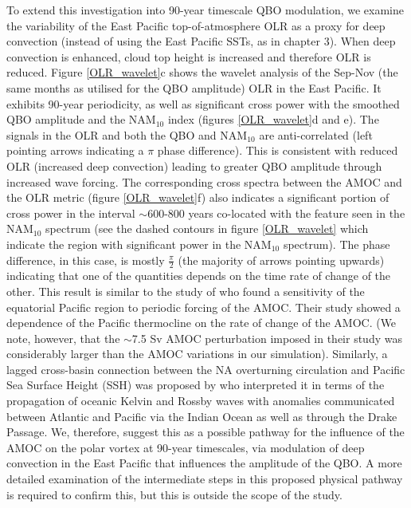 To extend this investigation into 90-year timescale QBO modulation, we examine the variability of the East Pacific top-of-atmosphere OLR as a proxy for deep convection (instead of using the East Pacific SSTs, as in chapter 3). When deep convection is enhanced, cloud top height is increased and therefore OLR is reduced. Figure \ref{OLR_wavelet}c shows the wavelet analysis of the Sep-Nov (the same months as utilised for the QBO amplitude) OLR in the East Pacific. It exhibits 90-year periodicity, as well as significant cross power with the smoothed QBO amplitude and the NAM$_{10}$ index (figures \ref{OLR_wavelet}d and e). The signals in the OLR and both the QBO and NAM$_{10}$ are anti-correlated (left pointing arrows indicating a $\pi$ phase difference). This is consistent with reduced OLR (increased deep convection) leading to greater QBO amplitude through increased wave forcing.  The corresponding cross spectra between the AMOC and the OLR metric (figure \ref{OLR_wavelet}f) also indicates a significant portion of cross power in the interval $\sim$600-800 years co-located with the feature seen in the NAM$_{10}$ spectrum (see the dashed contours in figure \ref{OLR_wavelet} which indicate the region with  significant power in the NAM$_{10}$ spectrum). The phase difference, in this case, is mostly $\frac{\pi}{2}$ (the majority of arrows pointing upwards) indicating that one of the quantities depends on the time rate of change of the other. This result is similar to the study of \cite{timmermannENSO2005d} who found a sensitivity of the equatorial Pacific region to periodic forcing of the AMOC. Their study showed a dependence of the Pacific thermocline on the rate of change of the AMOC. (We note, however, that the $\sim$7.5 Sv AMOC perturbation imposed in their study was considerably larger than the AMOC variations in our simulation). Similarly, a lagged cross-basin connection between the NA overturning circulation and Pacific Sea Surface Height (SSH) was proposed by \cite{cessiGlobal2004} who interpreted it in terms of the propagation of oceanic Kelvin and Rossby waves with anomalies communicated between Atlantic and Pacific via the Indian Ocean as well as through the Drake Passage. We, therefore, suggest this as a possible pathway for the influence of the AMOC on the polar vortex at 90-year timescales, via modulation of deep convection in the East Pacific that influences the amplitude of the QBO. A more detailed examination of the intermediate steps in this proposed physical pathway is required to confirm this, but this is outside the scope of the study.  

